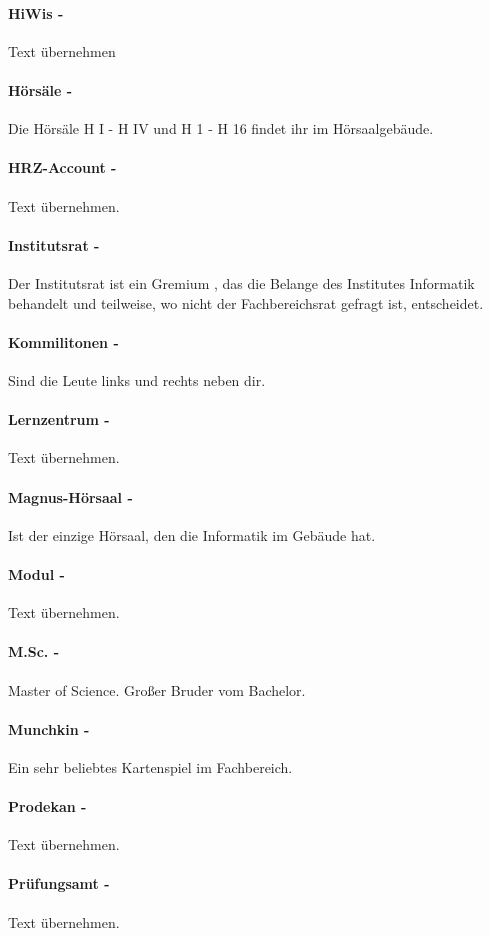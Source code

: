 \documentclass[12pt,a4paper]{article}
\begin{document}
	\paragraph{HiWis -} Text übernehmen
	\paragraph{Hörsäle -} Die Hörsäle H I - H IV und H 1 - H 16 findet ihr im Hörsaalgebäude.
	\paragraph{HRZ-Account -} Text übernehmen.
	\paragraph{Institutsrat -} Der Institutsrat ist ein Gremium , das die Belange des Institutes Informatik behandelt und teilweise, wo nicht der Fachbereichsrat gefragt ist, entscheidet.
	\paragraph{Kommilitonen -} Sind die Leute links und rechts neben dir.
	\paragraph{Lernzentrum -} Text übernehmen.
	\paragraph{Magnus-Hörsaal -} Ist der einzige Hörsaal, den die Informatik im Gebäude hat.
	\paragraph{Modul -} Text übernehmen.
	\paragraph{M.Sc. -} \glqq Master of Science\grqq . Großer Bruder vom Bachelor.
	\paragraph{Munchkin -} Ein sehr beliebtes Kartenspiel im Fachbereich. 
	\paragraph{Prodekan -} Text übernehmen.
	\paragraph{Prüfungsamt -} Text übernehmen.
\end{document}
